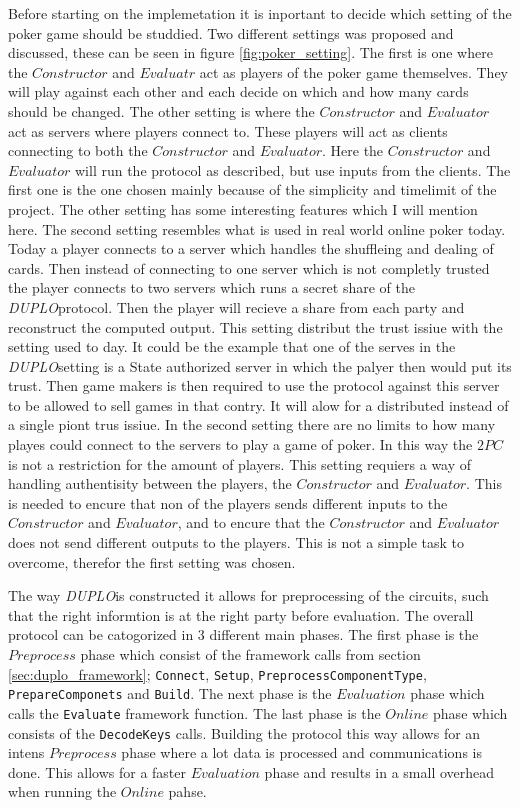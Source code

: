 \documentclass[twoside,11pt,openright]{report}
\newcommand{\DUPLO}{\textit{DUPLO}}
\begin{document}
Before starting on the implemetation it is inportant to decide which setting of the poker game should be studdied. Two different settings was proposed and discussed, these can be seen in figure \ref{fig:poker_setting}. The first is one where the $Constructor$ and $Evaluatr$ act as players of the poker game themselves. They will play against each other and each decide on which and how many cards should be changed. The other setting is where the $Constructor$ and $Evaluator$ act as servers where players connect to. These players will act as clients connecting to both the $Constructor$ and $Evaluator$. Here the $Constructor$ and $Evaluator$ will run the protocol as described, but use inputs from the clients. The first one is the one chosen mainly because of the simplicity and timelimit of the project. The other setting has some interesting features which I will mention here. The second setting resembles what is used in real world online poker today. Today a player connects to a server which handles the shuffleing and dealing of cards. Then instead of connecting to one server which is not completly trusted the player connects to two servers which runs a secret share of the \DUPLO protocol. Then the player will recieve a share from each party and reconstruct the computed output. This setting distribut the trust issiue with the setting used to day. It could be the example that one of the serves in the \DUPLO setting is a State authorized server in which the palyer then would put its trust. Then game makers is then required to use the protocol against this server to be allowed to sell games in that contry. It will alow for a distributed instead of a single piont trus issiue. In the second setting there are no limits to how many playes could connect to the servers to play a game of poker. In this way the $2PC$ is not a restriction for the amount of players. This setting requiers a way of handling authentisity between the players, the $Constructor$ and $Evaluator$. This is needed to encure that non of the players sends different inputs to the $Constructor$ and $Evaluator$, and to encure that the $Constructor$ and $Evaluator$ does not send different outputs to the players. This is not a simple task to overcome, therefor the first setting was chosen.

The way \DUPLO is constructed it allows for preprocessing of the circuits, such that the right informtion is at the right party before evaluation. The overall protocol can be catogorized in 3 different main phases. The first phase is the $Preprocess$ phase which consist of the framework calls from section \ref{sec:duplo_framework}; \verb|Connect|, \verb|Setup|, \verb|PreprocessComponentType|, \verb|PrepareComponets| and \verb|Build|. The next phase is the $Evaluation$ phase which calls the \verb|Evaluate| framework function. The last phase is the $Online$ phase which consists of the \verb|DecodeKeys| calls. Building the protocol this way allows for an intens $Preprocess$ phase where a lot data is processed and communications is done. This allows for a faster $Evaluation$ phase and results in a small overhead when running the $Online$ pahse.
\end{document}
